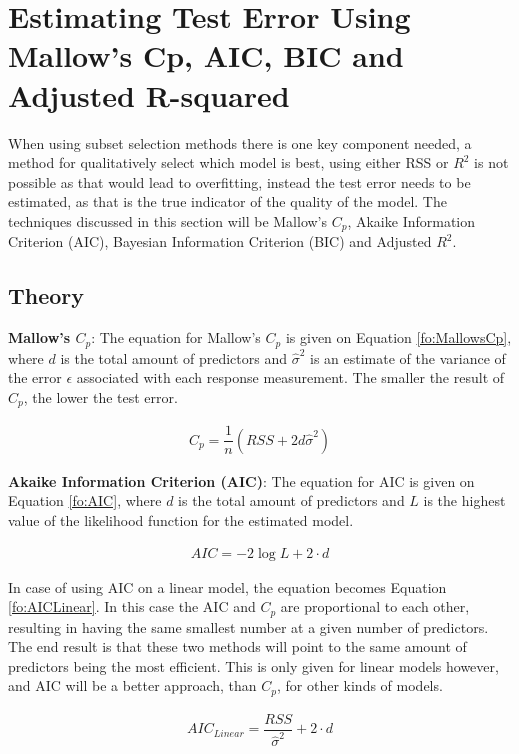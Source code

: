 \section{Estimating Test Error Using Mallow's Cp, AIC, BIC and Adjusted R-squared}\label{sc:estimatingTestError}
When using subset selection methods there is one key component needed, a method for qualitatively select which model is best, using either RSS or $R^2$ is not possible as that would lead to overfitting, instead the test error needs to be estimated, as that is the true indicator of the quality of the model. The techniques discussed in this section will be Mallow's $C_p$, Akaike Information Criterion (AIC), Bayesian Information Criterion (BIC) and Adjusted $R^2$.

\subsection{Theory}
\textbf{Mallow's $C_p$}: The equation for Mallow's $C_p$ is given on Equation  \ref{fo:MallowsCp}, where $d$ is the total amount of predictors and $\hat{\sigma}^2$ is an estimate of the variance of the error $\epsilon$ associated with each response measurement. The smaller the result of $C_p$, the lower the test error. 

\begin{align}\label{fo:MallowsCp}
	C_p = \dfrac{1}{n} (RSS + 2 d \hat{\sigma}^2)
\end{align}

\textbf{Akaike Information Criterion (AIC)}: The equation for AIC is given on Equation \ref{fo:AIC}, where $d$ is the total amount of predictors and $L$ is the highest value of the likelihood function for the estimated model.

\begin{align}\label{fo:AIC}
	AIC = -2 \log L + 2 \cdot d
\end{align}

In case of using AIC on a linear model, the equation becomes Equation \ref{fo:AICLinear}. In this case the AIC and $C_p$ are proportional to each other, resulting in having the same smallest number at a given number of predictors. The end result is that these two methods will point to the same amount of predictors being the most efficient. This is only given for linear models however, and AIC will be a better approach, than $C_p$, for other kinds of models.
 
\begin{align}\label{fo:AICLinear}
	AIC_{Linear} = \dfrac{RSS}{\hat{\sigma}^2} + 2 \cdot d
\end{align}

